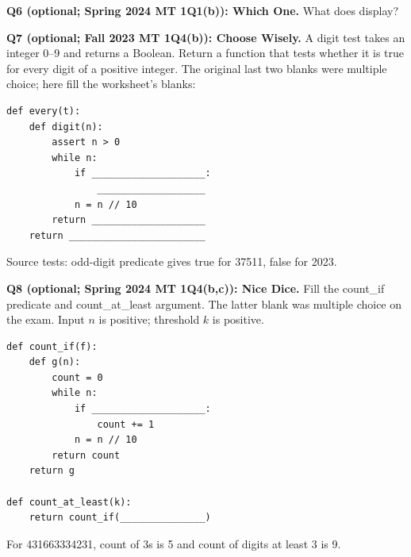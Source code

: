\begin{prob}
\textbf{Q6 (optional; Spring 2024 MT 1Q1(b)): Which One.} What does  display?
\end{prob}
\begin{prob}
\textbf{Q7 (optional; Fall 2023 MT 1Q4(b)): Choose Wisely.} A digit test takes an integer 0--9 and returns a Boolean. Return a function that tests whether it is true for every digit of a positive integer. The original last two blanks were multiple choice; here fill the worksheet's blanks:
\begin{lstlisting}
def every(t):
    def digit(n):
        assert n > 0
        while n:
            if ____________________:
                ___________________
            n = n // 10
        return ____________________
    return ________________________
\end{lstlisting}
Source tests: odd-digit predicate gives true for 37511, false for 2023.\par
{}
\end{prob}
\begin{prob}
\textbf{Q8 (optional; Spring 2024 MT 1Q4(b,c)): Nice Dice.} Fill the count\_if predicate and count\_at\_least argument. The latter blank was multiple choice on the exam. Input $n$ is positive; threshold $k$ is positive.
\begin{lstlisting}
def count_if(f):
    def g(n):
        count = 0
        while n:
            if ____________________:
                count += 1
            n = n // 10
        return count
    return g

def count_at_least(k):
    return count_if(_______________)
\end{lstlisting}
For 431663334231, count of 3s is 5 and count of digits at least 3 is 9.\par
{}
\end{prob}

